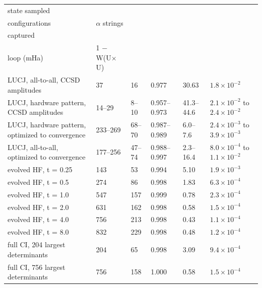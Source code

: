 \documentclass[11pt]{article}
\begin{document}
\begin{table}[htbp]
\begin{tabularx}{\linewidth}{@{}>{\hsize=1.000\hsize\raggedright\arraybackslash}Xlllll@{}}
\toprule
state sampled & \begin{tabular}[b]{@{}l@{}}distinct\\configurations\end{tabular} & $\alpha$ strings & \begin{tabular}[b]{@{}l@{}}full-CI weight\\captured\end{tabular} & \begin{tabular}[b]{@{}l@{}}static\\loop (mHa)\end{tabular} & 1 $-$ W(U$\times$U) \\
\midrule
LUCJ, all-to-all, CCSD amplitudes & 37 & 16 & 0.977 & 30.63 & $1.8\times10^{-2}$ \\
LUCJ, hardware pattern, CCSD amplitudes & 14--29 & 8--10 & 0.957--0.973 & 41.3--44.6 & $2.1\times10^{-2}$ to $2.4\times10^{-2}$ \\
LUCJ, hardware pattern, optimized to convergence & 233--269 & 68--70 & 0.987--0.989 & 6.0--7.6 & $2.4\times10^{-3}$ to $3.9\times10^{-3}$ \\
LUCJ, all-to-all, optimized to convergence & 177--256 & 47--74 & 0.988--0.997 & 2.3--16.4 & $8.0\times10^{-4}$ to $1.1\times10^{-2}$ \\
evolved HF, t = 0.25 & 143 & 53 & 0.994 & 5.10 & $1.9\times10^{-3}$ \\
evolved HF, t = 0.5 & 274 & 86 & 0.998 & 1.83 & $6.3\times10^{-4}$ \\
evolved HF, t = 1.0 & 547 & 157 & 0.999 & 0.78 & $2.3\times10^{-4}$ \\
evolved HF, t = 2.0 & 631 & 162 & 0.998 & 0.58 & $1.5\times10^{-4}$ \\
evolved HF, t = 4.0 & 756 & 213 & 0.998 & 0.43 & $1.1\times10^{-4}$ \\
evolved HF, t = 8.0 & 832 & 229 & 0.998 & 0.48 & $1.2\times10^{-4}$ \\
full CI, 204 largest determinants & 204 & 65 & 0.998 & 3.09 & $9.4\times10^{-4}$ \\
full CI, 756 largest determinants & 756 & 158 & 1.000 & 0.58 & $1.5\times10^{-4}$ \\
\bottomrule
\end{tabularx}
\end{table}
\end{document}
